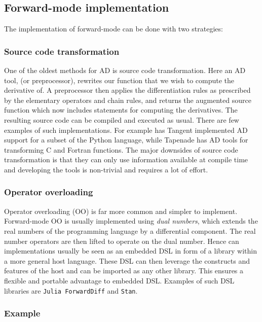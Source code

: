 \subsection{Forward-mode implementation}
The implementation of forward-mode can be done with two strategies:
\subsubsection*{Source code transformation}
One of the oldest methods for AD is source code transformation. Here an AD tool, (or preprocessor), rewrites our function that we wish to 
compute the derivative of. A preprocessor then applies the differentiation rules as prescribed by the elementary operators and chain rules, 
and returns the augmented source function which now includes statements for computing the derivatives. The resulting source
code can be compiled and executed as usual. There are few examples of such implementations. 
For example has Tangent\cite{DBLP:journals/corr/abs-1711-02712} implemented AD support for a subset of the Python language, 
while Tapenade has AD tools for transforming C and Fortran functions. The major downsides of source code transformation is that 
they can only use information available at compile time and developing the tools is non-trivial and requires a lot of effort. 
	
\subsubsection*{Operator overloading}
Operator overloading (OO) is far more common and simpler to implement.
Forward-mode OO is usually implemented using \emph{dual numbers}, which extends the real numbers 
of the programming language by a differential component. The real number operators are then lifted to
operate on the dual number. Hence can implementations usually be seen as an embedded DSL in form of a library within a 
more general host language. These DSL can then leverage the constructs and features of the host and can be imported
as any other library. This ensures a flexible and portable advantage to embedded DSL. Examples of such DSL libraries are 
\texttt{Julia ForwardDiff}\cite{RevelsLubinPapamarkou2016} and \texttt{Stan}\cite{DBLP:journals/corr/CarpenterHBLLB15}. 



\subsubsection{Example}

